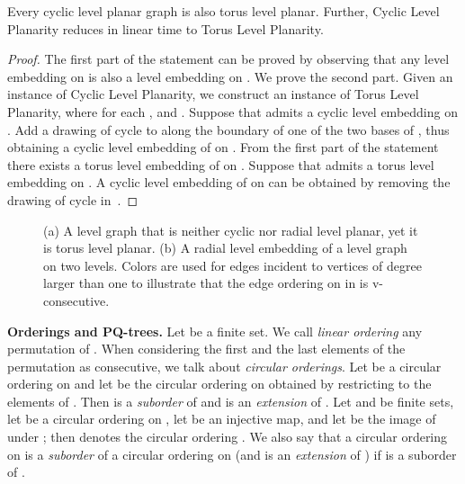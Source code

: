 \documentclass{llncs}
\begin{document}
\begin{lemma}\label{le:cyclic-torus}
Every cyclic level planar graph is also torus level planar.
Further, {\sc Cyclic Level Planarity} reduces in linear time to {\sc Torus Level Planarity}.
\end{lemma}

\begin{proof}
The first part of the statement can be proved by observing that any level embedding on  is also a level embedding on .
We prove the second part. Given an instance  of {\sc Cyclic Level Planarity}, we construct an instance   of {\sc Torus Level Planarity}, where  for each , and .
Suppose that  admits a cyclic level embedding  on . Add a drawing of cycle  to  along the boundary of one of the two bases of , thus obtaining a cyclic level embedding  of  on . From the first part of the statement there exists a torus level embedding of  on .
Suppose that  admits a torus level embedding  on .
A cyclic level embedding of  on  can be obtained by removing the drawing of cycle  in~.
\end{proof}


\begin{figure}[tb!]
\centering
{}\hfil
{}
\caption{(a) A level graph that is neither cyclic nor radial level planar, yet it is torus level planar. (b) A radial level embedding  of a level graph  on two levels. Colors are used for edges incident to vertices of degree larger than one to illustrate that the edge ordering on  in  is v-consecutive.} 
\label{fig:something}
\end{figure}

\smallskip
\noindent
{\bf Orderings and PQ-trees.} Let  be a finite set. 
We call {\em linear ordering} any permutation of .
When considering the first and the last elements of the permutation as consecutive, we talk about {\em circular orderings}. 
Let  be a circular ordering on  and let  be the circular ordering on  obtained by restricting  to the elements of . Then  is a {\em suborder} of  and  is an {\em extension} of . 
Let  and  be finite sets, let  be a circular ordering on , let   be an injective map, and let  be the image of  under ;
then  denotes the circular ordering .
We also say that a circular ordering  on  is a {\em suborder} of a circular ordering  on  (and  is an {\em extension} of ) if  is a suborder of .
\end{document}
